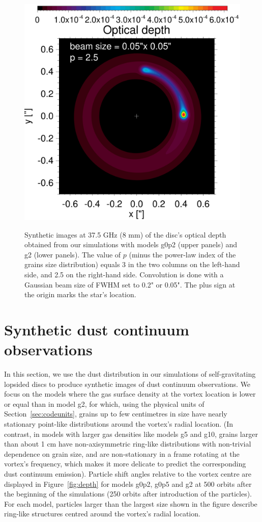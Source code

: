 \documentclass[a4paper,usenatbib]{mnras}
\begin{document}
\begin{figure}
{\includegraphics[width=0.24\hsize]{f10h.pdf}
}
\caption{\label{fig:synthetic} Synthetic images at 37.5 GHz (8 mm) of
  the disc's optical depth obtained from our simulations with models
  g0p2 (upper panels) and g2 (lower panels). The value of $p$ (minus
  the power-law index of the grains size distribution) equals 3 in the
  two columns on the left-hand side, and 2.5 on the right-hand
  side. Convolution is done with a Gaussian beam size of FWHM set to
  0.2" or 0.05". The plus sign at the origin marks the star's
  location. }
\end{figure}

\section{Synthetic dust continuum observations}
\label{sec:synthetic}

In this section, we use the dust distribution in our simulations of
self-gravitating lopsided discs to produce synthetic images of dust
continuum observations. We focus on the models where the gas surface
density at the vortex location is lower or equal than in model g2, for
which, using the physical units of Section~\ref{sec:codeunits}, grains
up to few centimetres in size have nearly stationary point-like
distributions around the vortex's radial location. (In contrast, in
models with larger gas densities like models g5 and g10, grains larger
than about 1 cm have non-axisymmetric ring-like distributions with
non-trivial dependence on grain size, and are non-stationary in a
frame rotating at the vortex's frequency, which makes it more delicate
to predict the corresponding dust continuum emission). Particle shift
angles relative to the vortex centre are displayed in
Figure~\ref{fig:depth} for models g0p2, g0p5 and g2 at 500 orbits
after the beginning of the simulations (250 orbits after introduction
of the particles). For each model, particles larger than the largest
size shown in the figure describe ring-like structures centred around
the vortex's radial location.
\end{document}
